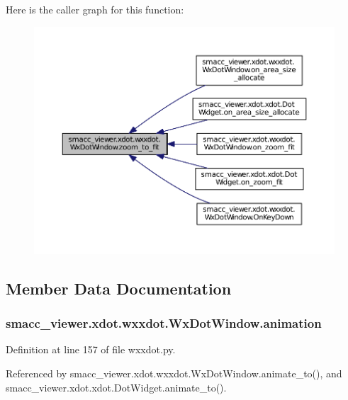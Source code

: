 Here is the caller graph for this function\+:
\nopagebreak
\begin{figure}[H]
\begin{center}
\leavevmode
\includegraphics[width=350pt]{classsmacc__viewer_1_1xdot_1_1wxxdot_1_1WxDotWindow_a06fdd60784dd744806e321a4d3959569_icgraph}
\end{center}
\end{figure}




\subsection{Member Data Documentation}
\subsubsection[{\texorpdfstring{animation}{animation}}]{\setlength{\rightskip}{0pt plus 5cm}smacc\+\_\+viewer.\+xdot.\+wxxdot.\+Wx\+Dot\+Window.\+animation}\hypertarget{classsmacc__viewer_1_1xdot_1_1wxxdot_1_1WxDotWindow_a8bb7e6e2d6476d543b3196b886d97bda}{}\label{classsmacc__viewer_1_1xdot_1_1wxxdot_1_1WxDotWindow_a8bb7e6e2d6476d543b3196b886d97bda}


Definition at line 157 of file wxxdot.\+py.



Referenced by smacc\+\_\+viewer.\+xdot.\+wxxdot.\+Wx\+Dot\+Window.\+animate\+\_\+to(), and smacc\+\_\+viewer.\+xdot.\+xdot.\+Dot\+Widget.\+animate\+\_\+to().

